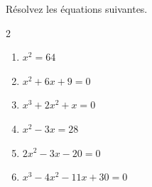%
%
    Résolvez les équations suivantes.
    \begin{multicols}{2}
        \begin{enumerate}
            \item \(x^2 = 64\) %
            \item \(x^2 + 6x + 9 = 0\) %
            \item \(x^3 + 2 x^2 + x = 0\) %
            \item \(x^2 -3x = 28 \) %
            \item \(2x^2-3x-20=0\) %
            \item \(x^3 - 4x^2 - 11x + 30 = 0\) %
        \end{enumerate}
    \end{multicols}
